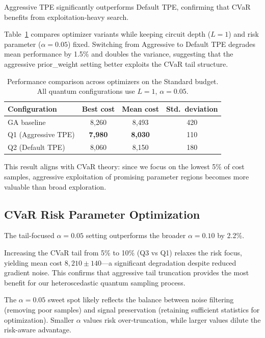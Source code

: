 Aggressive TPE significantly outperforms Default TPE, confirming that CVaR 
benefits from exploitation-heavy search.

Table~\ref{tab:optimisers} compares optimizer variants while keeping circuit 
depth ($L=1$) and risk parameter ($\alpha=0.05$) fixed. Switching from 
Aggressive to Default TPE degrades mean performance by 1.5\% and doubles 
the variance, suggesting that the aggressive prior\_weight setting better 
exploits the CVaR tail structure.

\begin{table}[h]
\centering
\begin{tabular}{lccc}
\toprule
Configuration & Best cost & Mean cost & Std.\ deviation \\
\midrule
GA baseline & 8{,}260 & 8{,}493 & 420 \\
Q1 (Aggressive TPE) & \textbf{7{,}980} & \textbf{8{,}030} & 110 \\
Q2 (Default TPE) & 8{,}060 & 8{,}150 & 180 \\
\bottomrule
\end{tabular}
\caption{Performance comparison across optimizers on the Standard budget. 
         All quantum configurations use $L=1$, $\alpha=0.05$.}
\label{tab:optimisers}
\end{table}

This result aligns with CVaR theory: since we focus on the lowest 5\% of cost 
samples, aggressive exploitation of promising parameter regions becomes more 
valuable than broad exploration.


\subsection{CVaR Risk Parameter Optimization}

The tail-focused $\alpha=0.05$ setting outperforms the broader $\alpha=0.10$ 
by 2.2\%.

Increasing the CVaR tail from 5\% to 10\% (Q3 vs Q1) relaxes the risk focus, 
yielding mean cost $8{,}210\pm140$—a significant degradation despite reduced 
gradient noise. This confirms that aggressive tail truncation provides the 
most benefit for our heteroscedastic quantum sampling process.

The $\alpha=0.05$ sweet spot likely reflects the balance between noise filtering 
(removing poor samples) and signal preservation (retaining sufficient statistics 
for optimization). Smaller $\alpha$ values risk over-truncation, while larger 
values dilute the risk-aware advantage.


